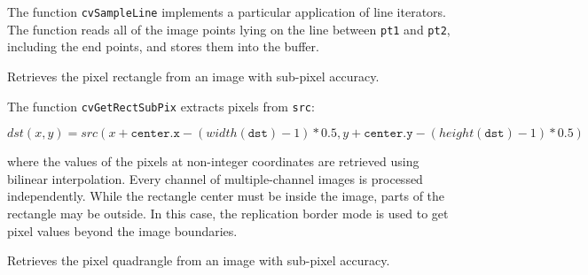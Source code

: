 \begin{description}
\end{description}

The function \texttt{cvSampleLine} implements a particular application of line iterators. The function reads all of the image points lying on the line between \texttt{pt1} and \texttt{pt2}, including the end points, and stores them into the buffer.

\label{GetRectSubPix}

Retrieves the pixel rectangle from an image with sub-pixel accuracy.
 

\begin{description}
\end{description}

The function \texttt{cvGetRectSubPix} extracts pixels from \texttt{src}:

\[
dst(x, y) = src(x + \texttt{center.x} - (width(\texttt{dst})-1)*0.5, y + \texttt{center.y} - (height(\texttt{dst} )-1)*0.5)
\]

where the values of the pixels at non-integer coordinates are retrieved
using bilinear interpolation. Every channel of multiple-channel
images is processed independently. While the rectangle center
must be inside the image, parts of the rectangle may be
outside. In this case, the replication border mode is used to get
pixel values beyond the image boundaries.

\label{GetQuadrangleSubPix}

Retrieves the pixel quadrangle from an image with sub-pixel accuracy.

